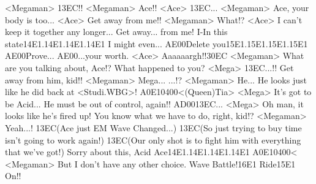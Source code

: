 <Megaman> {13}{EC}!! 
<Megaman> Ace!! 
<Ace> {13}{EC}... 
<Megaman> Ace, your body is too... 
<Ace> Get away from me!! 
<Megaman> What!? 
<Ace> I can't keep it together any longer... 
Get away... from me! 
I-In this state{14}{E1}.{14}{E1}.{14}{E1}.{14}{E1} I might even... 
{AE}{00}Delete you{15}{E1}.{15}{E1}.{15}{E1}.{15}{E1} 
{AE}{00}Prove... 
{AE}{00}...your worth. 
<Ace> Aaaaaargh!!{30}{EC}
<Megaman> What are you talking about, Ace!? 
What happened to you? 
<Mega> {13}{EC}...!! 
Get away from him, kid!! 
<Megaman> Mega... 
...!? 
<Megaman> He... 
He looks just like he did back at <Studi.WBG>! 
{A0}{E1}{04}{00}<(Queen)Tia> 
<Mega> It's got to be Acid... 
He must be out of control, again!! 
{AD}{00}{13}{EC}... 
<Mega> Oh man, it looks like he's fired up! 
You know what we have to do, right, kid!? 
<Megaman> Yeah...! 
{13}{EC}(Ace just EM Wave Changed...) 
{13}{EC}(So just trying to buy time  isn't going to work again!) 
{13}{EC}(Our only shot is  to fight him with  everything that we've got!) 
Sorry about this, Acid Ace{14}{E1}.{14}{E1}.{14}{E1}.{14}{E1} 
{A0}{E1}{04}{00}< 
<Megaman> But I don't have any other choice. 
Wave Battle!{16}{E1} Ride{15}{E1} On!! 
